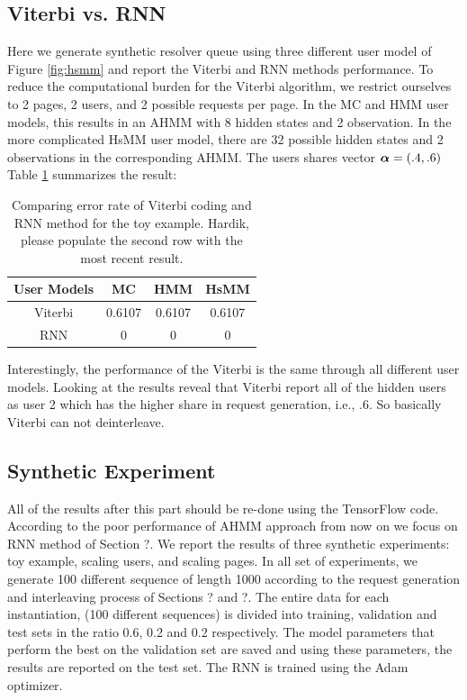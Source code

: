 \documentclass[conference]{IEEEtran}
\begin{document}
	\subsection{Viterbi vs. RNN}
	\label{subsec:viterbi}
	Here we generate synthetic resolver queue using three different user model of Figure \ref{fig:hsmm} and report the Viterbi and RNN methods performance. 
	To reduce the computational burden for the Viterbi algorithm, we restrict ourselves to 2 pages, 2 users, and 2 possible requests per page. 
	In the MC and HMM user models, this results in an AHMM with 8 hidden states and 2 observation. 
	In the more complicated HsMM user model, there are 32 possible hidden states and 2 observations in the corresponding AHMM. 
	The users shares vector $\boldsymbol{\alpha} = (.4, .6)$
	Table \ref{tab:viterbi} summarizes the result:
	\begin{table}
		\scriptsize  
		\centering
		\begin{tabular}{|c|c|c|c|}
			\hline
			{\bf User Models} & MC & HMM & HsMM \\ 
			\hline  
			Viterbi
			&  0.6107 	& 0.6107	&  0.6107  \\ \hline 
			RNN
			&  0 	& 0		&  0  \\ \hline 
		\end{tabular}
		\caption{Comparing error rate of Viterbi coding and RNN method for the toy example. {\color{red} Hardik, please populate the second row with the most recent result.}}
		\label{tab:viterbi}
	\end{table}
	Interestingly, the performance of the Viterbi is the same through all different user models. 
	Looking at the results reveal that Viterbi report all of the hidden users as user 2 which has the higher share in request generation, i.e., $.6$. 
	So basically Viterbi can not deinterleave. 
	
	\subsection{Synthetic Experiment}
	\label{subsec:synthetic}
	{\color{red} All of the results after this part should be re-done using the TensorFlow code.}
	According to the poor performance of AHMM approach from now on we focus on RNN method of Section ?.
	We report the results of three synthetic experiments: toy example, scaling users, and scaling pages.
	In all set of experiments, we generate 100 different sequence of length 1000 according to the request generation and interleaving process of Sections ? and ?.
	The entire data for each instantiation, (100 different sequences) is divided into training, validation and test sets in the ratio 0.6, 0.2 and 0.2 respectively. 
	The model parameters that perform the best on the validation set are saved and using these parameters, the results are reported on the test set. 
	The RNN is trained using the Adam optimizer.
	
\end{document}
